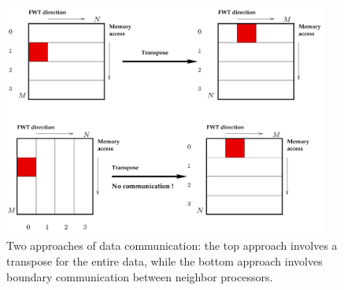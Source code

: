 \begin{figure}
    \centering
    \includegraphics[width=0.95\textwidth]{fig/c.png}
    \caption{Two approaches of data communication: 
             the top approach involves a transpose for the entire data,
             while the bottom approach involves boundary communication between neighbor processors.}
    \label{fig:c}
\end{figure}



